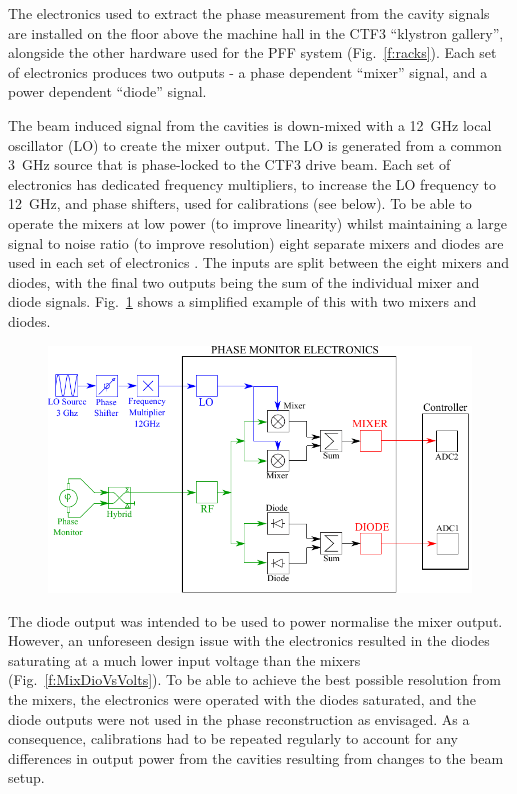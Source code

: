\documentclass[%
 reprint,
 superscriptaddress,
 amsmath,
 amssymb,
 prstab,
]{revtex4-1}
\begin{document}
The electronics used to extract the phase measurement from the cavity signals 
are installed on the floor above the machine hall in the CTF3 ``klystron 
gallery'', alongside the other hardware used for the PFF system 
(Fig.~\ref{f:racks}). 
Each set of electronics produces two outputs - a phase 
dependent ``mixer'' signal, and a power dependent ``diode'' signal. 

The beam induced signal from the cavities is down-mixed with a 12~GHz local 
oscillator (LO) to create the mixer output. The LO is generated 
from a common 3~GHz source that is phase-locked to the CTF3 drive beam.
Each set of electronics has dedicated frequency multipliers, to increase the LO 
frequency to 12~GHz, and phase shifters, used for calibrations (see below). To 
be able to operate the mixers at low power (to improve linearity) whilst 
maintaining a large signal to noise ratio (to improve resolution) eight 
separate mixers and diodes are used in each set of 
electronics \cite{alex09}. The inputs are split between the eight 
mixers and diodes, with the final two outputs being the sum of the individual 
mixer and diode signals. 
Fig.~\ref{f:phMonDiagram} shows a simplified example of this with two 
mixers and diodes. 

\begin{figure}
	\includegraphics[width=\columnwidth]{figs/hw/phMonDiagram}%
	\caption{\label{f:phMonDiagram}
	}
\end{figure}

The diode output was intended to be used to power normalise the mixer output. 
However, an unforeseen design issue with the electronics resulted in the diodes 
saturating at a much lower input voltage than the mixers 
(Fig.~\ref{f:MixDioVsVolts}). To be able to achieve the best possible 
resolution from the mixers, the electronics were operated with the diodes 
saturated, and the diode outputs were not used in the phase reconstruction as 
envisaged. As a consequence, calibrations had to be repeated regularly to 
account for any differences in output power from the cavities resulting from 
changes to the beam setup.
\end{document}
